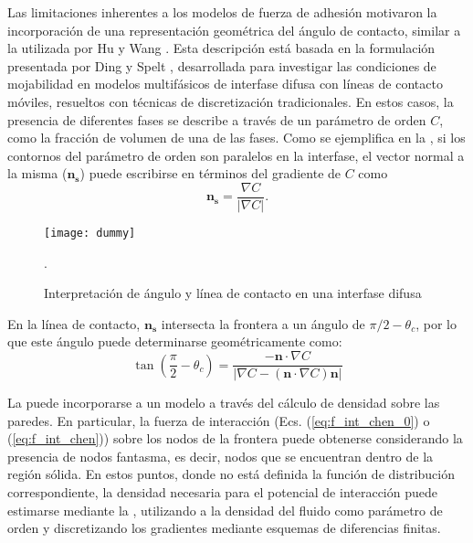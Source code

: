 Las limitaciones inherentes a los modelos de fuerza de adhesi\'on motivaron la incorporaci\'on de una representaci\'on geom\'etrica del \'angulo de contacto, similar a la utilizada por Hu \cite{hu_contact_2016} y Wang \cite{wang_scheme_2013}. Esta descripci\'on est\'a basada en la formulaci\'on presentada por Ding y Spelt \cite{ding_wetting_2007}, desarrollada para investigar las condiciones de mojabilidad en modelos multif\'asicos de interfase difusa con l\'ineas de contacto m\'oviles, resueltos con t\'ecnicas de discretizaci\'on tradicionales. En estos casos, la presencia de diferentes fases se describe a trav\'es de un par\'ametro de orden $C$, como la fracci\'on de volumen de una de las fases. Como se ejemplifica en la , si los contornos del par\'ametro de orden son paralelos en la interfase, el vector normal a la misma ($\bm{n_s}$) puede escribirse en t\'erminos del gradiente de $C$ como
\begin{equation}
	\bm{n_s} = \dfrac{\nabla C}{|\nabla C|}.
\end{equation}

\begin{figure}[ht]
	\centering
	\texttt{[image: dummy]}
	\caption{Interpretaci\'on de \'angulo y l\'inea de contacto en una interfase difusa}.
	\label{fig:ding_contacto}
\end{figure}

En la l\'inea de contacto, $\bm{n_s}$ intersecta la frontera a un \'angulo de $\pi/2 - \theta_c$, por lo que este \'angulo puede determinarse geom\'etricamente como:
\begin{equation}
	\tan \left( \dfrac{\pi}{2} - \theta_c \right) = \dfrac{-\bm{n} \cdot \nabla C}{|\nabla C - (\bm{n}\cdot \nabla C)\bm{n}|}
	\label{eq:ding_angulo}
\end{equation}

La  puede incorporarse a un modelo \pp{} a trav\'es del c\'alculo de densidad sobre las paredes. En particular, la fuerza de interacci\'on (Ecs. (\ref{eq:f_int_chen_0}) o (\ref{eq:f_int_chen})) sobre los nodos de la frontera puede obtenerse considerando la presencia de nodos fantasma, es decir, nodos que se encuentran dentro de la regi\'on s\'olida. En estos puntos, donde no est\'a definida la funci\'on de distribuci\'on correspondiente, la densidad necesaria para el potencial de interacci\'on puede estimarse mediante la , utilizando a la densidad del fluido como par\'ametro de orden y discretizando los gradientes mediante esquemas de diferencias finitas. 

